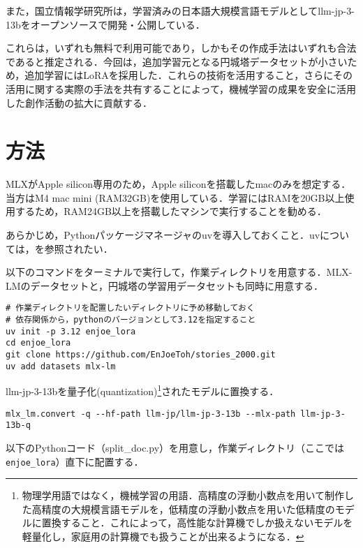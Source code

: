 \documentclass[10pt, a5paper, twoside]{jsarticle}
\theoremstyle{definition}
\begin{document}
		また，国立情報学研究所は，学習済みの日本語大規模言語モデルとしてllm-jp-3-13bをオープンソースで開発・公開している．

		これらは，いずれも無料で利用可能であり，しかもその作成手法はいずれも合法であると推定される．今回は，追加学習元となる円城塔データセットが小さいため，追加学習にはLoRAを採用した．これらの技術を活用すること，さらにその活用に関する実際の手法を共有することによって，機械学習の成果を安全に活用した創作活動の拡大に貢献する．

	\section{方法}

		MLXがApple silicon専用のため，Apple siliconを搭載したmacのみを想定する．当方はM4 mac mini (RAM32GB)を使用している．学習にはRAMを20GB以上使用するため，RAM24GB以上を搭載したマシンで実行することを勧める．

		あらかじめ，Pythonパッケージマネージャのuvを導入しておくこと．uvについては，\cite{tbys}を参照されたい．

		以下のコマンドをターミナルで実行して，作業ディレクトリを用意する．MLX-LMのデータセットと，円城塔の学習用データセットも同時に用意する．

		\begin{mdframed}
			\begin{verbatim}
# 作業ディレクトリを配置したいディレクトリに予め移動しておく
# 依存関係から，pythonのバージョンとして3.12を指定すること
uv init -p 3.12 enjoe_lora
cd enjoe_lora
git clone https://github.com/EnJoeToh/stories_2000.git
uv add datasets mlx-lm
			\end{verbatim}
		\end{mdframed}

		llm-jp-3-13bを量子化(quantization)\footnote{物理学用語ではなく，機械学習の用語．高精度の浮動小数点を用いて制作した高精度の大規模言語モデルを，低精度の浮動小数点を用いた低精度のモデルに置換すること．これによって，高性能な計算機でしか扱えないモデルを軽量化し，家庭用の計算機でも扱うことが出来るようになる\cite{ibm}．}されたモデルに置換する．

		\begin{mdframed}
			\begin{verbatim}
mlx_lm.convert -q --hf-path llm-jp/llm-jp-3-13b --mlx-path llm-jp-3-13b-q
			\end{verbatim}
		\end{mdframed}

		以下のPythonコード（split\_doc.py）を用意し，作業ディレクトリ（ここでは\texttt{enjoe\_lora}）直下に配置する．
\end{document}
